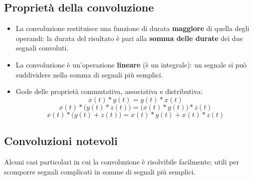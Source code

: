 \documentclass[12pt, a4paper]{article}
\begin{document}
\subsection{Proprietà della convoluzione}
\begin{itemize}
    \item La convoluzione restituisce una funzione di durata \textbf{maggiore} di quella degli operandi: la durata del risultato è pari alla \textbf{somma delle durate} dei due segnali convoluti.
    \item La convoluzione è un'operazione \textbf{lineare} (è un integrale): un segnale si può suddividere nella somma di segnali più semplici.
    \item Gode delle proprietà commutativa, associativa e distributiva:
    $$x(t) * y(t) = y(t) * x(t)$$
    $$x(t) * \big(y(t) * z(t)\big) = \big(x(t) * y(t)\big) * z(t)$$
    $$x(t) * \big(y(t) + z(t)\big) = x(t)*y(t) + x(t)*z(t)$$
\end{itemize}

\subsection{Convoluzioni notevoli}

Alcuni casi particolari in cui la convoluzione è risolvibile facilmente; utili per scomporre segnali complicati in somme di segnali più semplici.
\end{document}
